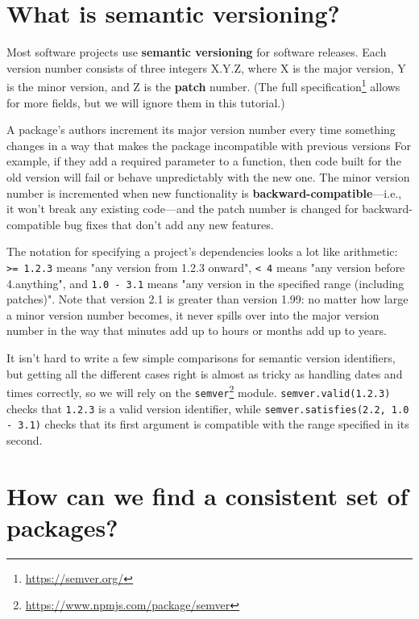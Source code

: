 \documentclass[krantzl]{krantz}
\newcommand{\glossref}[1]{\textbf{#1}}
\newcommand{\hreffoot}[2]{{#1}\footnote{\href{#2}{#2}}}
\begin{document}
\section{What is semantic versioning?}\label{package-manager-semver}


Most software projects use \glossref{semantic versioning} for software releases.
Each version number consists of three integers X.Y.Z,
where X is the major version,
Y is the minor version,
and Z is the \glossref{patch} number.
(The \hreffoot{full specification}{https://semver.org/} allows for more fields,
but we will ignore them in this tutorial.)


A package's authors increment its major version number
every time something changes in a way that makes the package incompatible with previous versions
For example,
if they add a required parameter to a function,
then code built for the old version will fail or behave unpredictably with the new one.
The minor version number is incremented when new functionality
is \glossref{backward-compatible}---i.e.,
it won't break any existing code---and the patch number is changed
for backward-compatible bug fixes that don't add any new features.


The notation for specifying a project's dependencies looks a lot like arithmetic:
\texttt{>= 1.2.3} means "any version from 1.2.3 onward",
\texttt{< 4} means "any version before 4.anything",
and \texttt{1.0 - 3.1} means "any version in the specified range (including patches)".
Note that version 2.1 is greater than version 1.99:
no matter how large a minor version number becomes,
it never spills over into the major version number
in the way that minutes add up to hours or months add up to years.


It isn't hard to write a few simple comparisons for semantic version identifiers,
but getting all the different cases right is almost as tricky as handling dates and times correctly,
so we will rely on the \hreffoot{\texttt{semver}}{https://www.npmjs.com/package/semver} module.
\texttt{semver.valid({\textquotesingle}1.2.3{\textquotesingle})} checks that \texttt{1.2.3} is a valid version identifier,
while \texttt{semver.satisfies({\textquotesingle}2.2{\textquotesingle}, {\textquotesingle}1.0 - 3.1{\textquotesingle})} checks that its first argument
is compatible with the range specified in its second.

\section{How can we find a consistent set of packages?}\label{package-manager-consistent}
\end{document}
